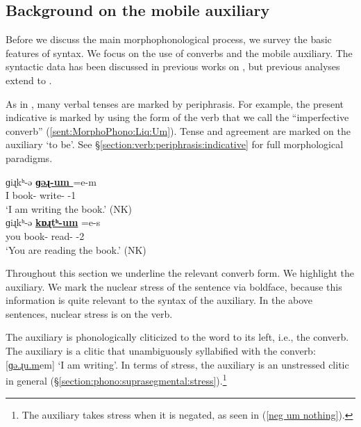 \subsection{Background on the mobile auxiliary}\label{section:morphophono:auxiliary:syntax}
Before we discuss the main morphophonological process, we     survey the  basic features of {\iaIA} syntax. We focus on the use of converbs and the mobile auxiliary. The syntactic data has been  discussed in previous works  on {\seaSEA}, but previous analyses   extend  to {\iaIA} \citep{Comrie-1984-SomeFormalPropertiesFOcusEasternArmenian,KahnemuyipourMegerdoomian-2011-secondcliticvP,KahnemuyipourMegerdoomian-2017-positionalDistriutionFocus}.  

As in {\seaSEA}, many verbal tenses are marked by periphrasis. For example, the present indicative is marked by using the form of the verb that we call the “imperfective converb” (\ref{sent:MorphoPhono:Liq:Um}). Tense and agreement are marked on the auxiliary `to be'.  See \S\ref{section:verb:periphrasis:indicative} for full morphological paradigms. 

\begin{exe}
	\ex  \label{sent:MorphoPhono:Liq:Um}
	\begin{xlist}
		\ex {}   {ɡiɻkʰ-ə}   \textbf{\uline{{ɡəɻ-um }}}  \colorbox{lsLightGray}{{=e-m}}
		\\
		I   book-{}  write-{\impfcvb}  {\auxgloss}-1{\sg}
		\\
		\trans `I am writing the book.' \hfill (NK)
		\\
		\ex {}  {ɡiɻkʰ-ə}  \textbf{\uline{{kɒɻtʰ-um}}}  \colorbox{lsLightGray}{{=e-s}}
		\\
		you  book-{}  read-{\impfcvb}  {\auxgloss}-2{\sg}
		\\
		\trans `You are reading the book.' \hfill (NK)
		\\
		
	\end{xlist} 
\end{exe}

Throughout this section we underline the relevant converb form. We highlight the auxiliary. We mark the nuclear stress of the sentence via boldface, because this information is quite relevant to the syntax of the auxiliary. In the above sentences, nuclear stress is on the verb.  

The auxiliary is phonologically cliticized to the word    to its left, i.e., the converb. The auxiliary is a clitic that   unambiguously syllabified with the converb: [{\uline{ɡə.ɻu.m}em}] `I am writing'. In terms of stress, the auxiliary is an unstressed clitic in general (\S\ref{section:phono:suprasegmental:stress}).\footnote{The auxiliary takes stress when it is negated, as seen in (\ref{neg um nothing}). } 

